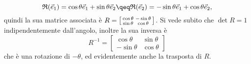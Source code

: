 \begin{equation}
	\mathfrak R(\vec e_1)=\cos\theta\vec e_1+\sin\theta\vec e_2\qeq \mathfrak R(\vec e_2)=-\sin\theta\vec e_1+\cos\theta\vec e_2,
	\label{eq:rotazione-base}
\end{equation}
quindi la sua matrice associata è $R=\begin{bsmallmatrix}\cos\theta&-\sin\theta\\\sin\theta&\cos\theta\end{bsmallmatrix}$.
Si vede subito che $\det R=1$ indipendentemente dall'angolo, inoltre la sua inversa è
\begin{equation}
	R^{-1}=
	\begin{bmatrix}
		\cos\theta	&\sin\theta\\
		-\sin\theta	&\cos\theta
	\end{bmatrix}
	\label{eq:rotazione-inversa-matrice}
\end{equation}
che è una rotazione di $-\theta$, ed evidentemente anche la trasposta di $R$.

